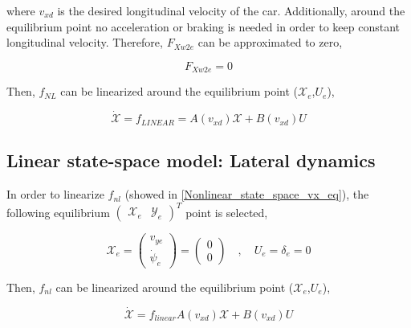\documentclass[12pt]{article}
\begin{document}
where $v_{xd}$ is the desired longitudinal velocity of the car. Additionally, around the equilibrium point no acceleration or braking is needed in order to keep constant longitudinal velocity. Therefore, $F_{Xw2e}$ can be approximated to zero,

\begin{equation}
    F_{Xw2e} = 0
\end{equation}

Then, $f_{NL}$ can be linearized around the equilibrium point ($\mathcal{X}_e$,$U_e$),

\begin{equation} \label{linear_expression_state}
    \dot{\mathcal{X}} = f_{LINEAR} = A (v_{xd}) \mathcal{X} + B (v_{xd}) U
\end{equation}

\subsection{Linear state-space model: Lateral dynamics}
In order to linearize $f_{nl}$ (showed in \eqref{Nonlinear_state_space_vx_eq}), the following equilibrium $ \begin{pmatrix} \mathcal{X}_e & \mathcal{Y}_e\end{pmatrix}^T$ point is selected,

\begin{equation}
    \mathcal{X}_e = \begin{pmatrix} v_{ye} \\ \Dot{\psi}_{e} \end{pmatrix} = \begin{pmatrix} 0 \\ 0  \end{pmatrix} \quad , \quad U_e =  \delta_{e} =  0 
\end{equation}

Then, $f_{nl}$ can be linearized around the equilibrium point ($\mathcal{X}_e$,$U_e$),

\begin{equation} \label{linear_expression_state}
    \dot{\mathcal{X}} = f_{linear} A (v_{xd}) \mathcal{X} + B (v_{xd}) U
\end{equation}
\end{document}
